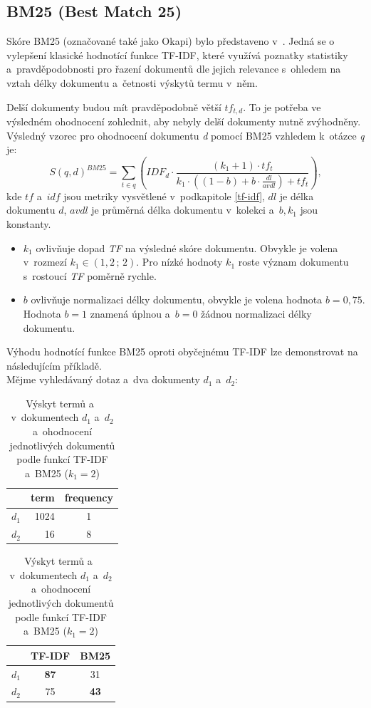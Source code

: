 \subsection{BM25 (Best Match 25)}
\label{bm25}
Skóre BM25 (označované také jako Okapi) bylo představeno v~\cite{bm25}. Jedná se o vylepšení klasické hodnotící funkce TF-IDF, které využívá poznatky statistiky a~pravděpodobnosti pro řazení dokumentů dle jejich relevance s~ohledem na vztah délky dokumentu a~četnosti výskytů termu v~něm.\par
Delší dokumenty budou mít pravděpodobně větší $tf_{t,d}$. To je potřeba ve výsledném ohodnocení zohlednit, aby nebyly delší dokumenty nutně zvýhodněny.
Výsledný vzorec pro ohodnocení dokumentu \emph{d} pomocí BM25 vzhledem k~otázce \emph{q} je:
\begin{equation}
    S(q,d)^{BM25} = \sum_{t \in q} \left(IDF_d \cdot \frac{(k_1+1)\cdot tf_t}{k_1\cdot ((1-b)+b \cdot \frac{dl}{avdl}) + tf_t}\right),
\end{equation}
kde $tf$ a~$idf$ jsou metriky vysvětlené v~podkapitole \ref{tf-idf}, $dl$ je délka dokumentu $d$, $avdl$ je průměrná délka dokumentu v~kolekci a~$b,k_1$ jsou konstanty.
\begin{itemize}
    \item $k_1$ ovlivňuje dopad \emph{TF} na výsledné skóre dokumentu. Obvykle je volena v~rozmezí $k_1\in(1,2\,;\,2)$. Pro nízké hodnoty $k_1$ roste význam dokumentu s~rostoucí \emph{TF} poměrně rychle.
    \item $b$ ovlivňuje normalizaci délky dokumentu, obvykle je volena hodnota $b=0,75$. Hodnota $b=1$ znamená úplnou a~$b=0$ žádnou normalizaci délky dokumentu.
\end{itemize}

Výhodu hodnotící funkce BM25 oproti obyčejnému TF-IDF lze demonstrovat na následujícím příkladě.\\ \medskip
Mějme vyhledávaný dotaz  a~dva dokumenty $d_1$ a~$d_2$:\par

\begin{table}[H]
\centering
\begin{tabular}{|c|r|c|}
\hline
      & term & frequency \\ \hline
$d_1$ & 1024 & 1         \\ \hline
$d_2$ & 16   & 8         \\ \hline
\end{tabular}
\begin{tabular}{|c|c|c|}
\hline
      & \textbf{TF-IDF} & \textbf{BM25} \\ \hline
$d_1$ & \textbf{87} & 31         \\ \hline
$d_2$ & 75 & \textbf{43}         \\ \hline
\end{tabular}
\caption{Výskyt termů  a~ v~dokumentech $d_1$ a~$d_2$ a~ohodnocení jednotlivých dokumentů podle funkcí TF-IDF a~BM25 ($k_1 = 2$) \cite{stanford:retrieval}}
\label{tab:tf}
\end{table}

